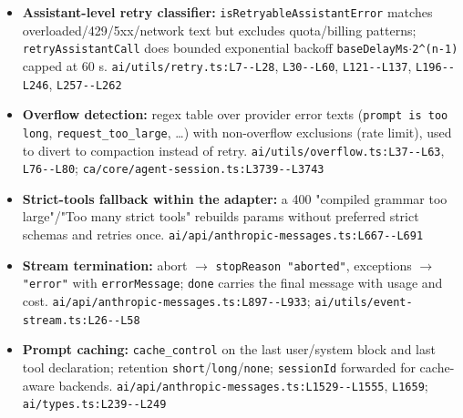 \begin{itemize}
\item \textbf{Assistant-level retry classifier:} \texttt{isRetryableAssistantError} matches overloaded/429/5xx/network text but excludes quota/billing patterns; \texttt{retryAssistantCall} does bounded exponential backoff \texttt{baseDelayMs$\cdot$2\textasciicircum{}(\allowbreak{}n-\allowbreak{}1)} capped at 60 s. \texttt{ai/\allowbreak{}utils/\allowbreak{}retry.\allowbreak{}ts:\allowbreak{}L7-\allowbreak{}-\allowbreak{}L28}, \texttt{L30-\allowbreak{}-\allowbreak{}L60}, \texttt{L121-\allowbreak{}-\allowbreak{}L137}, \texttt{L196-\allowbreak{}-\allowbreak{}L246}, \texttt{L257-\allowbreak{}-\allowbreak{}L262}
\item \textbf{Overflow detection:} regex table over provider error texts (\texttt{prompt is too long}, \texttt{request\_\allowbreak{}too\_\allowbreak{}large}, \ldots{}) with non-overflow exclusions (rate limit), used to divert to compaction instead of retry. \texttt{ai/\allowbreak{}utils/\allowbreak{}overflow.\allowbreak{}ts:\allowbreak{}L37-\allowbreak{}-\allowbreak{}L63}, \texttt{L76-\allowbreak{}-\allowbreak{}L80}; \texttt{ca/\allowbreak{}core/\allowbreak{}agent-\allowbreak{}session.\allowbreak{}ts:\allowbreak{}L3739-\allowbreak{}-\allowbreak{}L3743}
\item \textbf{Strict-tools fallback within the adapter:} a 400 "compiled grammar too large"/"Too many strict tools" rebuilds params without preferred strict schemas and retries once. \texttt{ai/\allowbreak{}api/\allowbreak{}anthropic-\allowbreak{}messages.\allowbreak{}ts:\allowbreak{}L667-\allowbreak{}-\allowbreak{}L691}
\item \textbf{Stream termination:} abort $\rightarrow$ \texttt{stopReason "aborted"}, exceptions $\rightarrow$ \texttt{"error"} with \texttt{errorMessage}; \texttt{done} carries the final message with usage and cost. \texttt{ai/\allowbreak{}api/\allowbreak{}anthropic-\allowbreak{}messages.\allowbreak{}ts:\allowbreak{}L897-\allowbreak{}-\allowbreak{}L933}; \texttt{ai/\allowbreak{}utils/\allowbreak{}event-\allowbreak{}stream.\allowbreak{}ts:\allowbreak{}L26-\allowbreak{}-\allowbreak{}L58}
\item \textbf{Prompt caching:} \texttt{cache\_\allowbreak{}control} on the last user/system block and last tool declaration; retention \texttt{short}/\texttt{long}/\texttt{none}; \texttt{sessionId} forwarded for cache-aware backends. \texttt{ai/\allowbreak{}api/\allowbreak{}anthropic-\allowbreak{}messages.\allowbreak{}ts:\allowbreak{}L1529-\allowbreak{}-\allowbreak{}L1555}, \texttt{L1659}; \texttt{ai/\allowbreak{}types.\allowbreak{}ts:\allowbreak{}L239-\allowbreak{}-\allowbreak{}L249}

\end{itemize}
